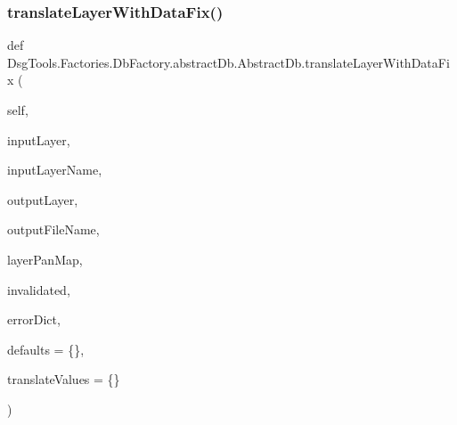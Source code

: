 \subsubsection{\texorpdfstring{translate\+Layer\+With\+Data\+Fix()}{translateLayerWithDataFix()}}
{\footnotesize\ttfamily def Dsg\+Tools.\+Factories.\+Db\+Factory.\+abstract\+Db.\+Abstract\+Db.\+translate\+Layer\+With\+Data\+Fix (\begin{DoxyParamCaption}\item[{}]{self,  }\item[{}]{input\+Layer,  }\item[{}]{input\+Layer\+Name,  }\item[{}]{output\+Layer,  }\item[{}]{output\+File\+Name,  }\item[{}]{layer\+Pan\+Map,  }\item[{}]{invalidated,  }\item[{}]{error\+Dict,  }\item[{}]{defaults = {\ttfamily \{\}},  }\item[{}]{translate\+Values = {\ttfamily \{\}} }\end{DoxyParamCaption})}

